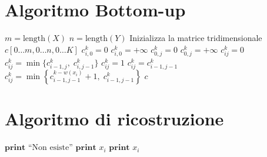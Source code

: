 \section{Algoritmo Bottom-up}

\begin{algorithm}[H]
\caption{Algoritmo Bottom-Up \textsc{SCSBU}$(X, Y, K)$}
\begin{algorithmic}[1]
\State $m = \text{length}(X)$
\State $n = \text{length}(Y)$
\State Inizializza la matrice tridimensionale $c[0 \dots m, 0 \dots n, 0 \dots K]$
            \State $c_{i,0}^k = 0$
        \Else
            \State $c_{i,0}^k = +\infty$
        \EndIf
    \EndFor
\EndFor
{}
            \State $c_{0,j}^k = 0$
        \Else
            \State $c_{0,j}^k = +\infty$
        \EndIf
    \EndFor
\EndFor
{}
                \State $c_{ij}^k = 0$
                \State $c_{ij}^k = \min\{c_{i-1, j}^k, \; c_{i, j-1}^k\}$
                \State $c_{ij}^k = 1$
                \State $c_{ij}^k = c_{i-1, j-1}^k$
            \Else
                \State $c_{ij}^k = \min\left\{c_{i-1, j-1}^{k - w(x_i)} + 1, \; c_{i-1, j-1}^k\right\}$
            \EndIf
        \EndFor
    \EndFor
\EndFor
\State \Return $c$
\end{algorithmic}
\end{algorithm}


\section{Algoritmo di ricostruzione}
\begin{algorithm}[H]
\caption{Procedura di Ricostruzione \textsc{SCSR}$(X, Y, i, j, k, c)$}
\begin{algorithmic}[1]
    \State $\textbf{print } \text{``Non esiste''}$
    \State \Return
\EndIf
{}
    \State \Return
\EndIf
{}
        \State {}
    \Else
        \State {}
    \EndIf
\Else
        \State $\textbf{print } x_i$
        \State \Return
        \State {}
    \Else
            \State {}
            \State $\textbf{print } x_i$
        \Else
            \State {}
        \EndIf
    \EndIf
\EndIf
\end{algorithmic}
\end{algorithm}